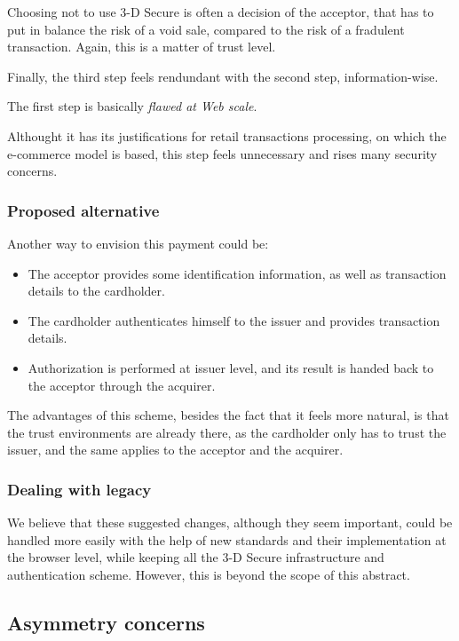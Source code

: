 Choosing not to use 3-D Secure is often a decision of the acceptor, that
has to put in balance the risk of a void sale, compared to the risk of a
fradulent transaction. Again, this is a matter of trust level.

Finally, the third step feels rendundant with the second step,
information-wise.

The first step is basically \emph{flawed at Web scale}.

Althought it has its justifications for retail transactions processing,
on which the e-commerce model is based, this step feels unnecessary and
rises many security concerns.

\subsubsection{Proposed alternative}\label{proposed-alternative}

Another way to envision this payment could be:

\begin{itemize}
\item
  The acceptor provides some identification information, as well as
  transaction details to the cardholder.
\item
  The cardholder authenticates himself to the issuer and provides
  transaction details.
\item
  Authorization is performed at issuer level, and its result is handed
  back to the acceptor through the acquirer.
\end{itemize}

The advantages of this scheme, besides the fact that it feels more
natural, is that the trust environments are already there, as the
cardholder only has to trust the issuer, and the same applies to the
acceptor and the acquirer.

\subsubsection{Dealing with legacy}\label{dealing-with-legacy}

We believe that these suggested changes, although they seem important,
could be handled more easily with the help of new standards and their
implementation at the browser level, while keeping all the 3-D Secure
infrastructure and authentication scheme. However, this is beyond the
scope of this abstract.

\subsection{Asymmetry concerns}\label{asymmetry-concerns}


